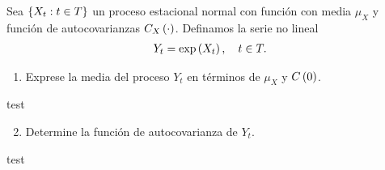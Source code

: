 \documentclass[../main.tex]{subfiles}
\begin{document}
    \begin{enunciado}
        Sea $\left\lbrace X_t : t \in T \right\rbrace$ un proceso estacional normal con función con media $\mu_X$ y función de autocovarianzas $C_X\left( \cdot \right)$. Definamos la serie no lineal
            \begin{align}
                \label{2:modelo}
                Y_t = \exp\left( X_t \right),\quad t \in T.
            \end{align}
        \begin{enumerate}
        	\item Exprese la media del proceso $Y_t$ en términos de $\mu_X$ y $C\left( 0 \right)$.
        \end{enumerate}

    \end{enunciado}
    \begin{demostracion}
        test
    \end{demostracion}
    \vspace{1em}
    \begin{enunciado}
    	\begin{enumerate}
    		\setcounter{enumi}{1}
        	\item Determine la función de autocovarianza de $Y_t$.
    	\end{enumerate}
    \end{enunciado}

    \begin{demostracion}
        test
    \end{demostracion}
\end{document}
